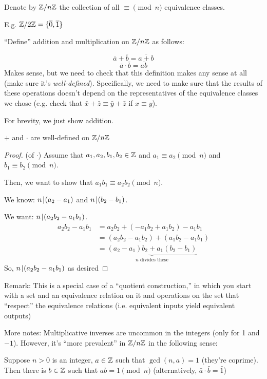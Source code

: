 \documentclass[notes.tex]{subfiles}
\begin{document}
\begin{definition}
	Denote by $\mathbb{Z}/n\mathbb{Z}$ the collection of all $\equiv\pmod n$ equivalence classes.
\end{definition}

E.g. $\mathbb{Z}/2\mathbb{Z} = \{\overline{0}, \overline{1}\}$

``Define'' addition and multiplication on $\mathbb{Z}/n\mathbb{Z}$ as follows:

\[
	\overline a + \overline b = \overline{a+b}
\]
\[
	\overline a \cdot \overline b = \overline{ab}
\]
Makes sense, but we need to check that this definition makes any sense at all (make sure it's \emph{well-defined}). Specifically, we need to make sure that the results of these operations doesn't depend on the representatives of the equivalence classes we chose (e.g. check that $\bar x + \bar z \equiv \bar y + \bar z$ if $x \equiv y$).

For brevity, we just show addition.

\begin{theorem}
	$+$ and $\cdot$ are well-defined on $\mathbb{Z}/n\mathbb{Z}$
\end{theorem}
\begin{proof}
	(of $\cdot$)
	Assume that $a_1, a_2, b_1, b_2\in\mathbb{Z}$ and $a_1\equiv a_2\pmod n$ and $b_1\equiv b_2\pmod n$.

	Then, we want to show that $a_1b_1\equiv a_2b_2\pmod n$.

	We know: $n\mkern2mu|\mkern1mu(a_2-a_1)$ and $n\mkern2mu|\mkern1mu(b_2-b_1)$.

	We want: $n\mkern2mu|\mkern1mu(a_2b_2-a_1b_1)$.
	\begin{align*}
		a_2b_2 - a_1b_1 &= a_2b_2 + (-a_1b_2 + a_1b_2) - a_1b_1\\
		&= (a_2b_2-a_1b_2) + (a_1b_2-a_1b_1)\\
		&= \underbrace{(a_2-a_1)b_2 + a_1(b_2-b_1)}_{n\text{ divides these}}
	\end{align*}
	So, $n\mkern2mu|\mkern1mu (a_2b_2 - a_1b_1)$ as desired
\end{proof}

Remark: This is a special case of a ``quotient construction,'' in which you start with a set and an equivalence relation on it and operations on the set that ``respect'' the equivalence relations (i.e. equivalent inputs yield equivalent outputs)

More notes:
Multiplicative inverses are uncommon in the integers (only for 1 and $-1$). However, it's ``more prevalent'' in $\mathbb{Z}/n\mathbb{Z}$ in the following sense:
\begin{theorem}
	Suppose $n>0$ is an integer, $a\in\mathbb{Z}$ such that $\gcd(n, a) = 1$ (they're coprime).
	Then there is $b\in\mathbb{Z}$ such that $ab = 1 \pmod n$ (alternatively, $\bar a \cdot \bar b = \bar 1$)
\end{theorem}
\end{document}
